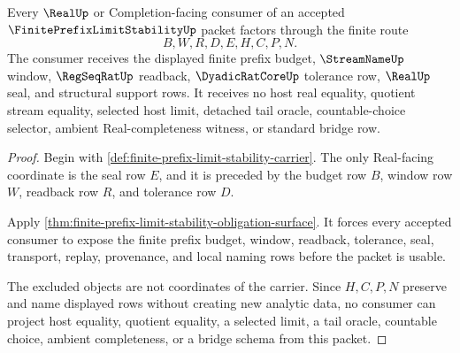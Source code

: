 \begin{theorem}
\label{thm:finite-prefix-limit-stability-prefix-nonescape}
Every $\RealUp$ or Completion-facing consumer of an accepted $\FinitePrefixLimitStabilityUp$ packet factors through the finite route
$$
B,W,R,D,E,H,C,P,N.
$$
The consumer receives the displayed finite prefix budget, $\StreamNameUp$ window, $\RegSeqRatUp$ readback, $\DyadicRatCoreUp$ tolerance row, $\RealUp$ seal, and structural support rows. It receives no host real equality, quotient stream equality, selected host limit, detached tail oracle, countable-choice selector, ambient Real-completeness witness, or standard bridge row.
\end{theorem}
\begin{proof}
Begin with \autoref{def:finite-prefix-limit-stability-carrier}. The only Real-facing coordinate is the seal row $E$, and it is preceded by the budget row $B$, window row $W$, readback row $R$, and tolerance row $D$.

Apply \autoref{thm:finite-prefix-limit-stability-obligation-surface}. It forces every accepted consumer to expose the finite prefix budget, window, readback, tolerance, seal, transport, replay, provenance, and local naming rows before the packet is usable.

The excluded objects are not coordinates of the carrier. Since $H,C,P,N$ preserve and name displayed rows without creating new analytic data, no consumer can project host equality, quotient equality, a selected limit, a tail oracle, countable choice, ambient completeness, or a bridge schema from this packet.
\end{proof}

